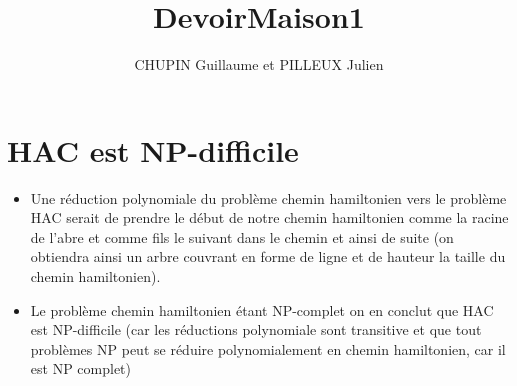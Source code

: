 \documentclass[10pt, a4paper]{article}
\title{DevoirMaison1}
\author {CHUPIN Guillaume et PILLEUX Julien}
\begin{document}
\maketitle
\thispagestyle {empty}
\newpage
\tableofcontents
\newpage

\section {HAC est NP-difficile}
\begin {itemize}
\item Une réduction polynomiale du problème chemin hamiltonien vers le problème HAC serait de prendre le début de notre chemin hamiltonien comme la racine de l'abre et comme fils le suivant dans le chemin et ainsi de suite (on obtiendra ainsi un arbre couvrant en forme de ligne et de hauteur la taille du chemin hamiltonien).
\item Le problème chemin hamiltonien étant NP-complet on en conclut que HAC est NP-difficile (car les réductions polynomiale sont transitive et que tout problèmes NP peut se réduire polynomialement en chemin hamiltonien, car il est NP complet)
\end {itemize}
\end{document}
